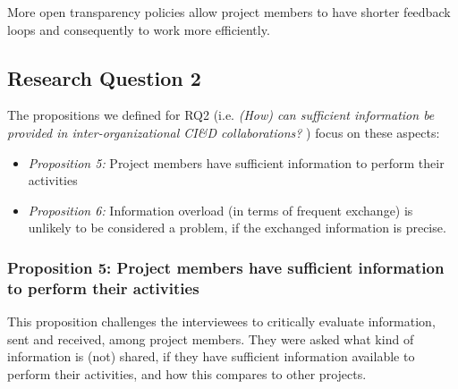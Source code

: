  More open transparency policies allow project members to have shorter feedback loops and consequently to work more efficiently.

\subsection{Research Question 2}\label{sec:ResearchQuestion2}

The propositions we defined for  
RQ2 (i.e. {\em {(How) can sufficient information be provided in inter-organizational CI\&D collaborations?}}
) focus on these aspects:

\begin{itemize}
\item %
\emph{Proposition 5:} Project members have sufficient information to perform their activities
\item %
\emph{Proposition 6:} Information overload (in terms of frequent exchange) is unlikely to be considered a problem, if the exchanged information is precise.
\end{itemize}

\subsubsection{Proposition 5: Project members have sufficient information to perform their activities}

%
%
%

This proposition challenges the interviewees to critically evaluate information, sent and received, among project members. 
They were asked what kind of information is (not) shared, if they have sufficient information available to perform their activities, and how this compares to other projects. 

